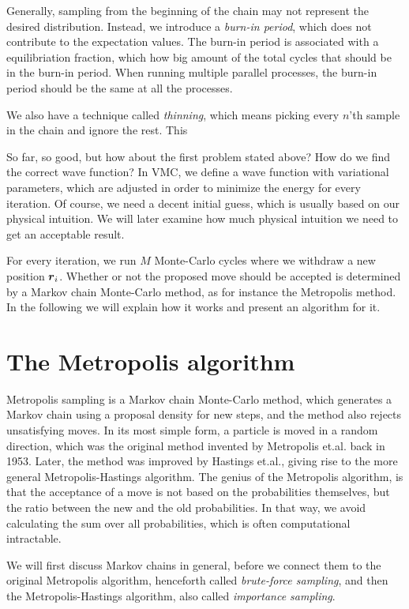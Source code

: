 Generally, sampling from the beginning of the chain may not represent the desired distribution. Instead, we introduce a \textit{burn-in period}, which does not contribute to the expectation values. The burn-in period is associated with a equilibriation fraction, which how big amount of the total cycles that should be in the burn-in period. When running multiple parallel processes, the burn-in period should be the same at all the processes.

We also have a technique called \textit{thinning}, which means picking every $n$'th sample in the chain and ignore the rest. This 

So far, so good, but how about the first problem stated above? How do we find the correct wave function? In VMC, we define a wave function with variational parameters, which are adjusted in order to minimize the energy for every iteration. Of course, we need a decent initial guess, which is usually based on our physical intuition. We will later examine how much physical intuition we need to get an acceptable result. 

For every iteration, we run $M$ Monte-Carlo cycles where we withdraw a new position $\boldsymbol{{r}}_i$. Whether or not the proposed move should be accepted is determined by a Markov chain Monte-Carlo method, as for instance the Metropolis method. In the following we will explain how it works and present an algorithm for it.

\section{The Metropolis algorithm}
Metropolis sampling is a Markov chain Monte-Carlo method, which generates a Markov chain using a proposal density for new steps, and the method also rejects unsatisfying moves. In its most simple form, a particle is moved in a random direction, which was the original method invented by Metropolis et.al. back in 1953. \cite{metropolis_equation_1953} Later, the method was improved by Hastings et.al., giving rise to the more general Metropolis-Hastings algorithm. \cite{hastings_monte_1970}
The genius of the Metropolis algorithm, is that the acceptance of a move is not based on the probabilities themselves, but the ratio between the new and the old probabilities. In that way, we avoid calculating the sum over all probabilities, which is often computational intractable.

We will first discuss Markov chains in general, before we connect them to the original Metropolis algorithm, henceforth called \textit{brute-force sampling}, and then the Metropolis-Hastings algorithm, also called \textit{importance sampling}.

